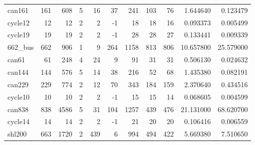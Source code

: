 \begin{tabular}{|l|r|r|r|r|r|r|r|r|r|r|}
can161 & 161 & 608 & 5 & 16 & 37 & 241 & 103 & 76 & 1.644640 & 0.123479 \\
cycle12 & 12 & 12 & 2 & 2 & -1 & 18 & 18 & 16 & 0.093373 & 0.005499 \\
cycle19 & 19 & 19 & 2 & 2 & -1 & 28 & 28 & 27 & 0.133441 & 0.009339 \\
662_bus & 662 & 906 & 1 & 9 & 264 & 1158 & 813 & 806 & 10.657800 & 25.579000 \\
can61 & 61 & 248 & 4 & 24 & 9 & 91 & 31 & 31 & 0.506130 & 0.024632 \\
can144 & 144 & 576 & 5 & 14 & 38 & 216 & 52 & 68 & 1.435380 & 0.082191 \\
can229 & 229 & 774 & 2 & 12 & 70 & 343 & 184 & 159 & 2.370640 & 0.434516 \\
cycle10 & 10 & 10 & 2 & 2 & -1 & 15 & 15 & 14 & 0.068605 & 0.004599 \\
can838 & 838 & 4586 & 5 & 31 & 104 & 1257 & 439 & 476 & 21.131000 & 68.620700 \\
cycle14 & 14 & 14 & 2 & 2 & -1 & 21 & 20 & 20 & 0.106416 & 0.006559 \\
shl200 & 663 & 1720 & 2 & 439 & 6 & 994 & 494 & 422 & 5.669380 & 7.510650 \\
\bottomrule
\end{tabular}
